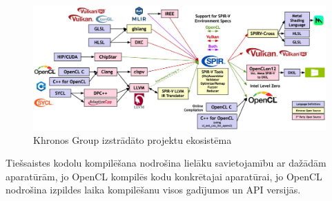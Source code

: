 \begin{figure}[H]
    \centering
    \includegraphics[width=\textwidth]{images/2024-spirv-language-ecosystem.jpg}
    \caption{Khronos Group izstrādāto projektu ekosistēma \cite{spirv-ecosystem-image}}
    \label{img:khronos_ecosystem}
\end{figure}

Tiešsaistes kodolu kompilēšana nodrošina lielāku savietojamību ar dažādām
aparatūrām, jo OpenCL kompilēs kodu konkrētajai aparatūrai, jo OpenCL nodrošina
izpildes laika kompilēšanu visos gadījumos un API versijās.
